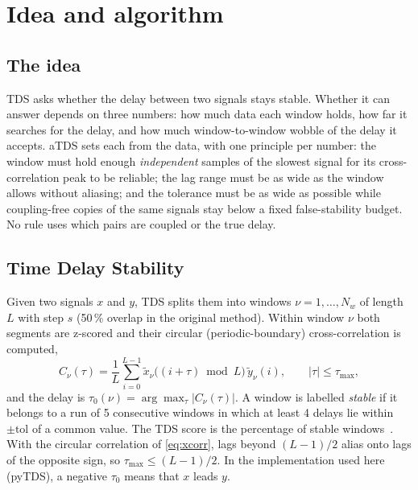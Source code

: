 \documentclass[11pt,a4paper]{article}
\begin{document}
\section{Idea and algorithm}
\label{sec:method}
\subsection{The idea}
\label{sec:idea}
TDS asks whether the delay between two signals stays stable. Whether it can answer depends on three numbers: how much data each window holds, how far it searches for the delay, and how much window-to-window wobble of the delay it accepts. aTDS sets each from the data, with one principle per number: the window must hold enough \emph{independent} samples of the slowest signal for its cross-correlation peak to be reliable; the lag range must be as wide as the window allows without aliasing; and the tolerance must be as wide as possible while coupling-free copies of the same signals stay below a fixed false-stability budget. No rule uses which pairs are coupled or the true delay.

\subsection{Time Delay Stability}
\label{sec:tds}
Given two signals $x$ and $y$, TDS splits them into windows $\nu = 1, \dots, N_w$ of length $L$ with step $s$ (50\,\% overlap in the original method). Within window $\nu$ both segments are z-scored and their circular (periodic-boundary) cross-correlation is computed,
\begin{equation}
C_\nu(\tau) = \frac{1}{L} \sum_{i=0}^{L-1} \tilde{x}_\nu\big((i+\tau) \bmod L\big)\, \tilde{y}_\nu(i), \qquad |\tau| \le \tau_{\max} ,
\label{eq:xcorr}
\end{equation}
and the delay is $\tau_0(\nu) = \arg\max_\tau |C_\nu(\tau)|$. A window is labelled \emph{stable} if it belongs to a run of 5 consecutive windows in which at least 4 delays lie within $\pm\mathrm{tol}$ of a common value. The TDS score is the percentage of stable windows~\cite{Bashan2012NetworkPhysiology,Bartsch2015NetworkPhysiology}. With the circular correlation of \cref{eq:xcorr}, lags beyond $(L-1)/2$ alias onto lags of the opposite sign, so $\tau_{\max} \le (L-1)/2$. In the implementation used here (pyTDS), a negative $\tau_0$ means that $x$ leads $y$.
\end{document}
